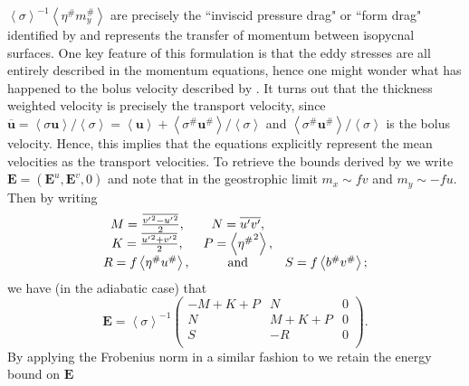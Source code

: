 \documentclass[10pt,a4paper]{report}
\newcommand*\thkmean[1]{\overline{#1}}
\newcommand*\thkres[1]{{#1}^{\prime}}
\newcommand*\nthkmean[1]{\left\langle{#1}\right\rangle}
\newcommand*\nthkres[1]{{#1}^{\#}}
\begin{document}
                   $\nthkmean{\sigma}^{-1}\nthkmean{\nthkres{\eta}\nthkres{m}_{y}}$ are
                   precisely the ``inviscid pressure drag"  or ``form drag" identified
                   by \cite{rhines1979theoretical} and represents the transfer of momentum
                   between isopycnal surfaces. One key feature of this formulation
                   is that the eddy stresses are all entirely described in the momentum
                   equations, hence one might wonder what has happened to 
                   the bolus velocity described by \cite{gent1995parameterizing}. 
                   It turns out that the thickness weighted velocity is precisely 
                   the transport velocity, since $\thkmean{\boldsymbol{u}}=\nthkmean{\sigma\boldsymbol{u}}/\nthkmean{\sigma}=\nthkmean{\boldsymbol{u}} + \nthkmean{\nthkres{\sigma}\nthkres{\boldsymbol{u}}}/\nthkmean{\sigma}$
                   and  $\nthkmean{\nthkres{\sigma}\nthkres{\boldsymbol{u}}}/\nthkmean{\sigma}$
                   is the bolus velocity. Hence, this implies that  the equations explicitly
                    represent the mean velocities as the  transport velocities.
                     To retrieve the bounds derived by \cite{marshall2012framework} 
                     we write $\boldsymbol{E} = (\boldsymbol{E}^{u}, \boldsymbol{E}^{v}, 0)$
                     and note that in the geostrophic limit $m_x \sim fv$ and  $m_y \sim -fu$.
                     Then by writing 
                     \begin{equation}
                     \begin{array}{ccc}
                     M = \frac{\thkmean{{\thkres{v}}^{2} - {\thkres{u}}^{2}}}{2}, & 
                     N = \thkmean{\thkres{u}\thkres{v} }, \\
                     K = \frac{\thkmean{{\thkres{u}}^{2} + {\thkres{v}}^{2}}}{2}, & 
                     P =  \nthkmean{{\nthkres{\eta}}^{2}},  \\ 
                     R =  f\nthkmean{\nthkres{\eta}\nthkres{u}}, \, & \rm and  &  
                     S = f\nthkmean{\nthkres{b}\nthkres{v}} ;
                     \end{array} 
                     \end{equation}
                     we have (in the adiabatic case) that
                     \begin{equation}
                     \boldsymbol{E}=\nthkmean{\sigma}^{-1}\left(
                     \begin{array}{ccc}
                     -M+K+P & N & 0 \\
                     N & M+K+P & 0 \\
                     S & -R & 0 \\
                     \end{array}\right).
                     \end{equation}
                     By applying the Frobenius norm in a similar fashion to 
                     \cite{marshall2012framework} we retain the energy bound on
                      $\boldsymbol{E}$
                      
\end{document}
